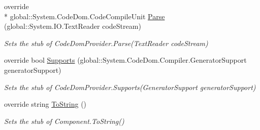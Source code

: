\begin{DoxyCompactItemize}
override \\*
global\-::\-System.\-Code\-Dom.\-Code\-Compile\-Unit \hyperlink{class_microsoft_1_1_c_sharp_1_1_fakes_1_1_stub_c_sharp_code_provider_af7cab0fb54882ab563fc09798596fc0e}{Parse} (global\-::\-System.\-I\-O.\-Text\-Reader code\-Stream)
\begin{DoxyCompactList}\small\item\em Sets the stub of Code\-Dom\-Provider.\-Parse(\-Text\-Reader code\-Stream)\end{DoxyCompactList}\item 
override bool \hyperlink{class_microsoft_1_1_c_sharp_1_1_fakes_1_1_stub_c_sharp_code_provider_a850568ca1ab63fafda4fbffdad7be0c7}{Supports} (global\-::\-System.\-Code\-Dom.\-Compiler.\-Generator\-Support generator\-Support)
\begin{DoxyCompactList}\small\item\em Sets the stub of Code\-Dom\-Provider.\-Supports(\-Generator\-Support generator\-Support)\end{DoxyCompactList}\item 
override string \hyperlink{class_microsoft_1_1_c_sharp_1_1_fakes_1_1_stub_c_sharp_code_provider_a3feec0c51da50a06ad70320458b72e35}{To\-String} ()
\begin{DoxyCompactList}\small\item\em Sets the stub of Component.\-To\-String()\end{DoxyCompactList}\end{DoxyCompactItemize}
